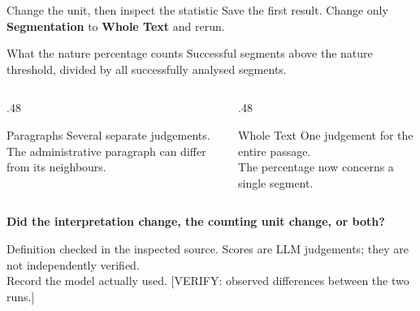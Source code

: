 \documentclass[aspectratio=169,10pt]{beamer}
\newcommand{\key}[1]{\textcolor{aegean}{\textbf{#1}}}
\newcommand{\source}[1]{\vfill{\scriptsize\color{slate}#1\par}}
\newcommand{\question}[1]{\medskip\par\key{#1}\par}
\begin{document}
\begin{frame}{Change the unit, then inspect the statistic}
  \small Save the first result. Change only \textbf{Segmentation} to \textbf{Whole Text} and rerun.
  \begin{block}{What the nature percentage counts}
    Successful segments above the nature threshold, divided by all successfully analysed segments.
  \end{block}
  \begin{columns}[T]
    \begin{column}{.48\textwidth}
      \begin{block}{Paragraphs}
        Several separate judgements.\\
        The administrative paragraph can differ from its neighbours.
      \end{block}
    \end{column}
    \begin{column}{.48\textwidth}
      \begin{block}{Whole Text}
        One judgement for the entire passage.\\
        The percentage now concerns a single segment.
      \end{block}
    \end{column}
  \end{columns}
  \question{Did the interpretation change, the counting unit change, or both?}
  \source{Definition checked in the inspected source. Scores are LLM judgements; they are not independently verified.\\
  Record the model actually used. [VERIFY: observed differences between the two runs.]}
\end{frame}
\end{document}
